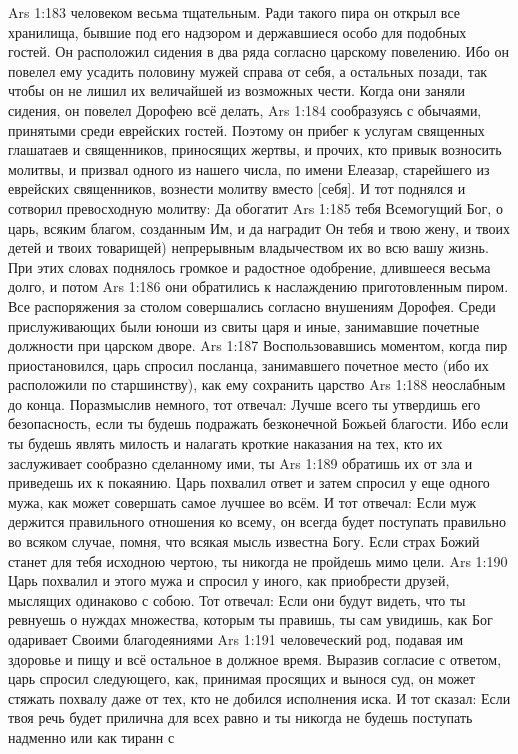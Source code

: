 \vs Ars 1:183
человеком весьма тщательным. Ради такого пира он открыл все хранилища, бывшие под его надзором и державшиеся особо для подобных гостей. Он расположил сидения в два ряда согласно царскому повелению. Ибо он повелел ему усадить половину мужей справа от себя, а остальных позади, так чтобы он не лишил их величайшей из возможных чести. Когда они заняли сидения, он повелел Дорофею всё делать,
\vs Ars 1:184
сообразуясь с обычаями, принятыми среди еврейских гостей. Поэтому он прибег к услугам священных глашатаев и священников, приносящих жертвы, и прочих, кто привык возносить молитвы, и призвал одного из нашего числа, по имени Елеазар, старейшего из еврейских священников, вознести молитву вместо [себя]. И тот поднялся и сотворил превосходную молитву: Да обогатит
\vs Ars 1:185
тебя Всемогущий Бог, о царь, всяким благом, созданным Им, и да наградит Он тебя и твою жену, и твоих детей и твоих товарищей) непрерывным владычеством их во всю вашу жизнь. При этих словах поднялось громкое и радостное одобрение, длившееся весьма долго, и потом
\vs Ars 1:186
они обратились к наслаждению приготовленным пиром. Все распоряжения за столом совершались согласно внушениям Дорофея. Среди прислуживающих были юноши из свиты царя и иные, занимавшие почетные должности при царском дворе.
\vs Ars 1:187
Воспользовавшись моментом, когда пир приостановился, царь спросил посланца, занимавшего почетное место (ибо их расположили по старшинству), как ему сохранить царство
\vs Ars 1:188
неослабным до конца. Поразмыслив немного, тот отвечал: Лучше всего ты утвердишь его безопасность, если ты будешь подражать безконечной Божьей благости. Ибо если ты будешь являть милость и налагать кроткие наказания на тех, кто их заслуживает сообразно сделанному ими, ты
\vs Ars 1:189
обратишь их от зла и приведешь их к покаянию.
Царь похвалил ответ и затем спросил у еще одного мужа, как может совершать самое лучшее во всём. И тот отвечал: Если муж держится правильного отношения ко всему, он всегда будет поступать правильно во всяком случае, помня, что всякая мысль известна Богу. Если страх Божий станет для тебя исходною чертою, ты никогда не пройдешь мимо цели.
\vs Ars 1:190
Царь похвалил и этого мужа и спросил у иного, как приобрести друзей, мыслящих одинаково с собою. Тот отвечал: Если они будут видеть, что ты ревнуешь о нуждах множества, которым ты правишь, ты сам увидишь, как Бог одаривает Своими благодеяниями
\vs Ars 1:191
человеческий род, подавая им здоровье и пищу и всё остальное в должное время.
Выразив согласие с ответом, царь спросил следующего, как, принимая просящих и вынося суд, он может стяжать похвалу даже от тех, кто не добился исполнения иска. И тот сказал: Если твоя речь будет прилична для всех равно и ты никогда не будешь поступать надменно или как тиранн с
